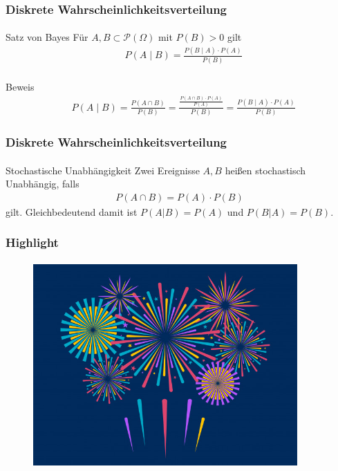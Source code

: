 \documentclass{beamer}
\begin{document}
\begin{frame}
    \frametitle{Diskrete Wahrscheinlichkeitsverteilung}
\framesubtitle{}

\begin{block}{Satz von Bayes}
Für $A,B \subset \mathcal{P}(\Omega)$ mit  $P(B) > 0$ gilt
\begin{align*}
& P(A \; | \;  B) = \frac{P(B \; | \; A) \cdot P(A)} {P(B)} \\
\end{align*}
\end{block}

\begin{block}{Beweis}
\begin{align*}
& P(A \; | \;  B) =\frac{P(A \cap B)}{P(B)} = \frac{ \frac{P(A \cap B) \cdot P(A)}{P(A)}}{P(B)}  =  \frac{P(B \; | \; A) \cdot P(A)} {P(B)} 
\end{align*}
\end{block}



 \end{frame}



\begin{frame}
    \frametitle{Diskrete Wahrscheinlichkeitsverteilung}
\framesubtitle{}

\begin{block}{Stochastische Unabhängigkeit}
Zwei Ereignisse $A,B$ heißen stochastisch Unabhängig, falls
\begin{align*}
P(A \cap B) = P(A) \cdot P(B)
\end{align*}
gilt.  Gleichbedeutend damit ist  $P(A | B) = P(A)$ und $P(B  | A) = P(B)$.
\end{block}



 \end{frame}


\begin{frame}
    \frametitle{Highlight}
\framesubtitle{}
\begin{figure}[htp]
      \centering
    \includegraphics[width=0.9\textwidth]{img/firework}
\end{figure}
 \end{frame}
\end{document}
